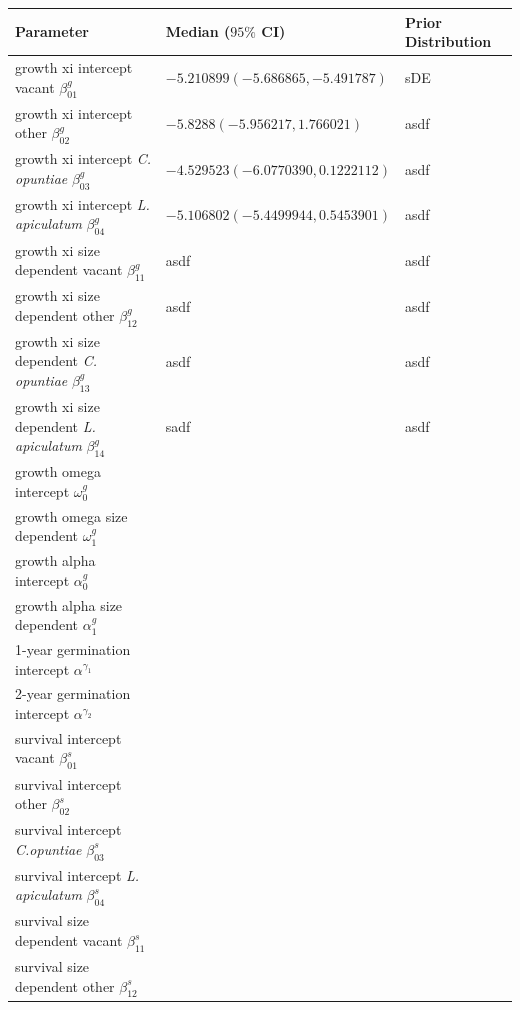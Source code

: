\documentclass[11pt]{article}
\begin{document}
\renewcommand{\thetable}{\arabic{table}}
\setcounter{table}{0}

\begin{table}[]
	\begin{tabular}{l|l|l}
		\textbf{Parameter} & \textbf{Median ($95\%$ CI)} & \textbf{Prior Distribution} \\
		\hline
		growth xi intercept vacant $\beta_{01}^g$ & $-5.210899 (-5.686865, -5.491787)$ & sDE\\
		growth xi intercept other $\beta_{02}^g$ & $-5.8288 (-5.956217, 1.766021) $&asdf \\
		growth xi intercept \textit{C. opuntiae} $\beta_{03}^g$ & $-4.529523 (-6.0770390, 0.1222112)$ & asdf\\
		growth xi intercept \textit{L. apiculatum} $\beta_{04}^g$ & $-5.106802 (-5.4499944, 0.5453901)$ & asdf\\
		growth xi size dependent vacant $\beta_{11}^g$ & asdf&asdf \\
		growth xi size dependent other $\beta_{12}^g$ & asdf&asdf \\
		growth xi size dependent \textit{C. opuntiae} $\beta_{13}^g$ & asdf&asdf \\
		growth xi size dependent \textit{L. apiculatum} $\beta_{14}^g$ &sadf &asdf \\
		growth omega intercept $\omega_0^g$ & & \\
		growth omega size dependent $\omega_1^g$ & & \\
		growth alpha intercept $\alpha_0^g$ & & \\
		growth alpha size dependent $\alpha_1^g$ & & \\
		\hline
		1-year germination intercept $\alpha^{\gamma_1}$ & & \\
		2-year germination intercept $\alpha^{\gamma_2}$ & & \\
		\hline
		survival intercept vacant $\beta_{01}^s$ & & \\
		survival intercept other $\beta_{02}^s$ & & \\
		survival intercept \textit{C.opuntiae} $\beta_{03}^s$ & & \\
		survival intercept \textit{L. apiculatum} $\beta_{04}^s$ & & \\
		survival size dependent vacant $\beta_{11}^s$ & & \\
		survival size dependent other $\beta_{12}^s$ & & \\

\end{tabular}
\end{table}
\end{document}
